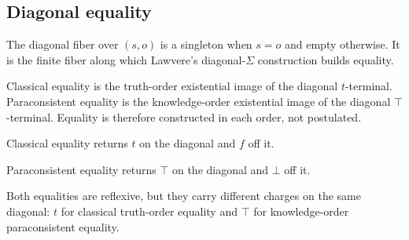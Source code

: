 \subsection{Diagonal equality}

\begin{proposition}\label{thm:diagFiber}\leanok{}
The diagonal fiber over $(s,o)$ is a singleton when $s=o$ and empty otherwise.
It is the finite fiber along which Lawvere's diagonal-$\Sigma$ construction
builds equality.
\end{proposition}

\begin{proposition}\label{thm:classicalEq}\leanok{}
Classical equality is the truth-order existential image of the diagonal
$t$-terminal. Paraconsistent equality is the knowledge-order existential image
of the diagonal $\top$-terminal. Equality is therefore constructed in each
order, not postulated.
\end{proposition}

\begin{theorem}\label{thm:classicalEq-eq}\leanok{}
Classical equality returns $t$ on the diagonal and $f$ off it.
\end{theorem}

\begin{theorem}\label{thm:paraconsistentEq-eq}\leanok{}
Paraconsistent equality returns $\top$ on the diagonal and $\bot$ off it.
\end{theorem}

\begin{corollary}\label{cor:eq-refl}\leanok{}
Both equalities are reflexive, but they carry different charges on the same
diagonal: $t$ for classical truth-order equality and $\top$ for
knowledge-order paraconsistent equality.
\end{corollary}
